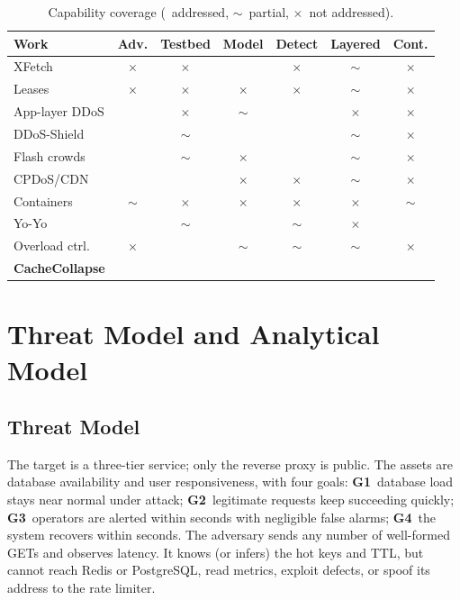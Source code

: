 \documentclass[journal]{IEEEtran}
\newcommand{\yes}{\checkmark}
\newcommand{\no}{$\times$}
\newcommand{\prt}{$\sim$}
\begin{document}
\begin{table}[t]
\centering
\caption{Capability coverage (\yes~addressed, \prt~partial, \no~not addressed).}
\label{tab:capability}
\footnotesize
\setlength{\tabcolsep}{3pt}
\begin{tabular}{@{}lcccccc@{}}
\toprule
Work & Adv. & Testbed & Model & Detect & Layered & Cont. \\
\midrule
XFetch \cite{vattani2015} & \no & \no & \yes & \no & \prt & \no \\
Leases \cite{nishtala2013} & \no & \no & \no & \no & \prt & \no \\
App-layer DDoS \cite{xie2009,praseed2019} & \yes & \no & \prt & \yes & \no & \no \\
DDoS-Shield \cite{ranjan2009} & \yes & \prt & \yes & \yes & \prt & \no \\
Flash crowds \cite{jung2002,kandula2005} & \yes & \prt & \no & \yes & \prt & \no \\
CPDoS/CDN \cite{nguyen2019,guo2020} & \yes & \yes & \no & \no & \prt & \no \\
Containers \cite{combe2016,sultan2019} & \prt & \no & \no & \no & \no & \prt \\
Yo-Yo \cite{sides2016,bremlerbarr2017} & \yes & \prt & \yes & \prt & \no & \yes \\
Overload ctrl.\ \cite{welsh2001,welsh2003} & \no & \yes & \prt & \prt & \prt & \no \\
\textbf{CacheCollapse} & \yes & \yes & \yes & \yes & \yes & \yes \\
\bottomrule
\end{tabular}
\end{table}

\section{Threat Model and Analytical Model}
\label{sec:threat}

\subsection{Threat Model}
The target is a three-tier service; only the reverse proxy is public. The assets are
database availability and user responsiveness, with four goals: \textbf{G1}~database
load stays near normal under attack; \textbf{G2}~legitimate requests keep succeeding
quickly; \textbf{G3}~operators are alerted within seconds with negligible false
alarms; \textbf{G4}~the system recovers within seconds. The adversary sends any
number of well-formed GETs and observes latency. It knows (or infers) the hot keys and
TTL, but cannot reach Redis or PostgreSQL, read metrics, exploit defects, or spoof its
address to the rate limiter.
\end{document}
